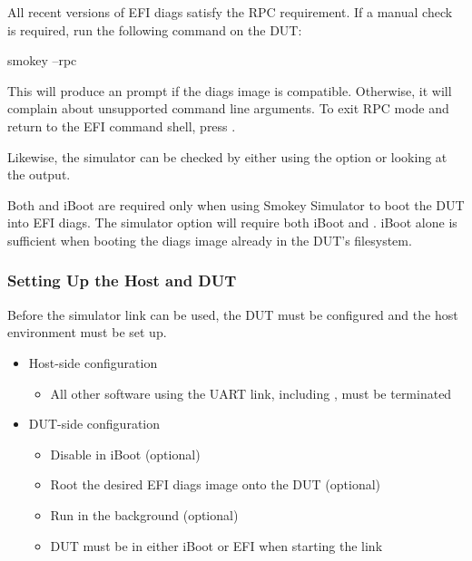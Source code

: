 All recent versions of EFI diags satisfy the RPC requirement.  If a manual
check is required, run the following command on the DUT:

\begin{CommandLine}
smokey --rpc
\end{CommandLine}

This will produce an  prompt if the diags image is compatible.
Otherwise, it will complain about unsupported command line arguments.  To exit
RPC mode and return to the EFI command shell, press \KeyCapsCtrlD.

Likewise, the simulator can be checked by either using the 
option or looking at the  output.

Both  and iBoot are required only when using Smokey Simulator
to boot the DUT into EFI diags.  The simulator option  will
require both iBoot and .  iBoot alone is sufficient when
booting the diags image already in the DUT's filesystem.

\subsubsection{Setting Up the Host and DUT}
\label{sec:Setup}

Before the simulator link can be used, the DUT must be configured and the host
environment must be set up.

\begin{itemize}

	\item Host-side configuration

	\begin{itemize}

		\item All other software using the UART link, including
		, must be terminated

	\end{itemize}

	\item DUT-side configuration

	\begin{itemize}

		\item Disable  in iBoot (optional)

		\item Root the desired EFI diags image onto the DUT (optional)

		\item Run  in the background (optional)

		\item DUT must be in either iBoot or EFI when starting the link

	\end{itemize}

\end{itemize}

